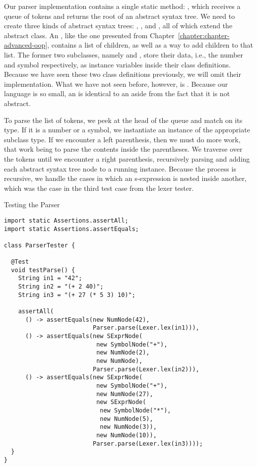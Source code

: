 \begin{verbnobox}[\footnotesize]
\begin{verbnobox}[\footnotesize]
\begin{verbnobox}[\footnotesize]
\begin{verbnobox}[\footnotesize]
Our parser implementation contains a single static method: , which receives a queue of tokens and returns the root of an abstract syntax tree. We need to create three kinds of abstract syntax trees: , , and , all of which extend the abstract  class. An , like the one presented from Chapter~\ref{chapter:chapter-advanced-oop}, contains a list of children, as well as a way to add children to that list. The former two subclasses, namely  and , store their data, i.e., the number and symbol respectively, as instance variables inside their class definitions. Because we have seen these two class definitions previously, we will omit their implementation. What we have not seen before, however, is . Because our language is so small, an  is identical to an  aside from the fact that it is not abstract.

To parse the list of tokens, we peek at the head of the queue and match on its type. If it is a number or a symbol, we instantiate an instance of the appropriate subclass type. If we encounter a left parenthesis, then we must do more work, that work being to parse the contents inside the parentheses. We traverse over the tokens until we encounter a right parenthesis, recursively parsing and adding each abstract syntax tree node to a running  instance. Because the process is recursive, we handle the cases in which an s-expression is nested inside another, which was the case in the third test case from the lexer tester.

\begin{cl}{Testing the Parser}
\begin{lstlisting}[language=MyJava]
import static Assertions.assertAll;
import static Assertions.assertEquals;

class ParserTester {

  @Test
  void testParse() {
    String in1 = "42";
    String in2 = "(+ 2 40)";
    String in3 = "(+ 27 (* 5 3) 10)";

    assertAll(
      () -> assertEquals(new NumNode(42), 
                         Parser.parse(Lexer.lex(in1))),
      () -> assertEquals(new SExprNode(
                          new SymbolNode("+"),
                          new NumNode(2),
                          new NumNode), 
                         Parser.parse(Lexer.lex(in2))),
      () -> assertEquals(new SExprNode(
                          new SymbolNode("+"),
                          new NumNode(27),
                          new SExprNode(
                           new SymbolNode("*"),
                           new NumNode(5),
                           new NumNode(3)),
                          new NumNode(10)), 
                         Parser.parse(Lexer.lex(in3))));
  }
}
\end{lstlisting}
\end{cl}


\end{verbnobox}
\end{verbnobox}
\end{verbnobox}
\end{verbnobox}

